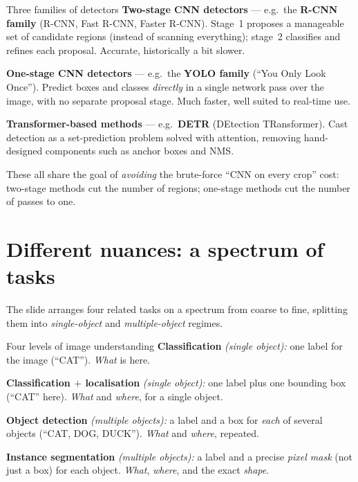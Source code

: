 \documentclass{report}
\begin{document}
\begin{defbox}{Three families of detectors}
\textbf{Two-stage CNN detectors} --- e.g.\ the \textbf{R-CNN family}
(R-CNN, Fast R-CNN, Faster R-CNN). Stage~1 proposes a manageable set of
candidate regions (instead of scanning everything); stage~2 classifies and
refines each proposal. Accurate, historically a bit slower.

\medskip
\textbf{One-stage CNN detectors} --- e.g.\ the \textbf{YOLO family} (``You Only
Look Once''). Predict boxes and classes \emph{directly} in a single network
pass over the image, with no separate proposal stage. Much faster, well suited
to real-time use.

\medskip
\textbf{Transformer-based methods} --- e.g.\ \textbf{DETR} (DEtection
TRansformer). Cast detection as a set-prediction problem solved with attention,
removing hand-designed components such as anchor boxes and NMS.
\end{defbox}

These all share the goal of \emph{avoiding} the brute-force ``CNN on every
crop'' cost: two-stage methods cut the number of regions; one-stage methods cut
the number of passes to one.

\section{Different nuances: a spectrum of tasks}

The slide arranges four related tasks on a spectrum from coarse to fine,
splitting them into \emph{single-object} and \emph{multiple-object} regimes.

\begin{defbox}{Four levels of image understanding}
\textbf{Classification} \emph{(single object):} one label for the image
(``CAT''). \emph{What} is here.

\medskip
\textbf{Classification $+$ localisation} \emph{(single object):} one label plus
one bounding box (``CAT'' here). \emph{What} and \emph{where}, for a single
object.

\medskip
\textbf{Object detection} \emph{(multiple objects):} a label and a box for
\emph{each} of several objects (``CAT, DOG, DUCK''). \emph{What} and
\emph{where}, repeated.

\medskip
\textbf{Instance segmentation} \emph{(multiple objects):} a label and a precise
\emph{pixel mask} (not just a box) for each object. \emph{What}, \emph{where},
and the exact \emph{shape}.
\end{defbox}
\end{document}
